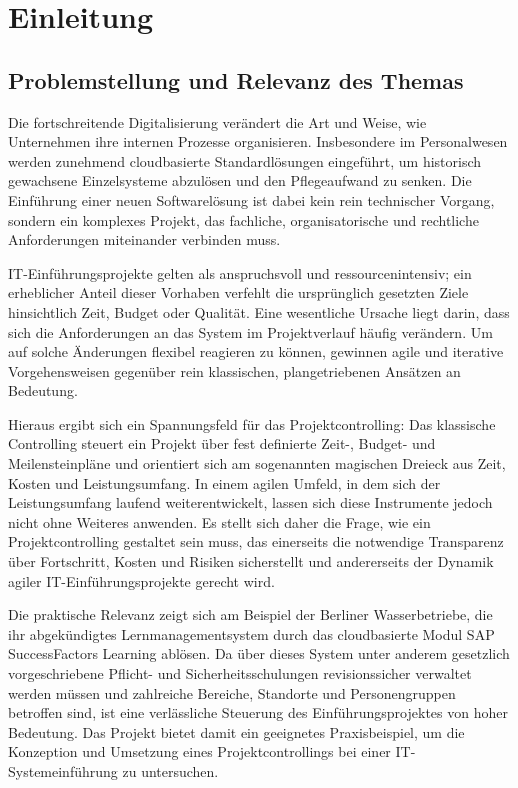 \documentclass[
    12pt, 
    a4paper,
    ]{scrartcl} %
\begin{document}
\newpage
{} %
\setcounter{page}{1}


\section{Einleitung}

\subsection{Problemstellung und Relevanz des Themas}
Die fortschreitende Digitalisierung verändert die Art und Weise, wie Unternehmen ihre internen Prozesse organisieren. Insbesondere im Personalwesen werden zunehmend cloudbasierte Standardlösungen eingeführt, um historisch gewachsene Einzelsysteme abzulösen und den Pflegeaufwand zu senken. Die Einführung einer neuen Softwarelösung ist dabei kein rein technischer Vorgang, sondern ein komplexes Projekt, das fachliche, organisatorische und rechtliche Anforderungen miteinander verbinden muss.

IT-Einführungsprojekte gelten als anspruchsvoll und ressourcenintensiv; ein erheblicher Anteil dieser Vorhaben verfehlt die ursprünglich gesetzten Ziele hinsichtlich Zeit, Budget oder Qualität. Eine wesentliche Ursache liegt darin, dass sich die Anforderungen an das System im Projektverlauf häufig verändern. Um auf solche Änderungen flexibel reagieren zu können, gewinnen agile und iterative Vorgehensweisen gegenüber rein klassischen, plangetriebenen Ansätzen an Bedeutung.

Hieraus ergibt sich ein Spannungsfeld für das Projektcontrolling: Das klassische Controlling steuert ein Projekt über fest definierte Zeit-, Budget- und Meilensteinpläne und orientiert sich am sogenannten magischen Dreieck aus Zeit, Kosten und Leistungsumfang. In einem agilen Umfeld, in dem sich der Leistungsumfang laufend weiterentwickelt, lassen sich diese Instrumente jedoch nicht ohne Weiteres anwenden. Es stellt sich daher die Frage, wie ein Projektcontrolling gestaltet sein muss, das einerseits die notwendige Transparenz über Fortschritt, Kosten und Risiken sicherstellt und andererseits der Dynamik agiler IT-Einführungsprojekte gerecht wird.

Die praktische Relevanz zeigt sich am Beispiel der Berliner Wasserbetriebe, die ihr abgekündigtes Lernmanagementsystem durch das cloudbasierte Modul SAP SuccessFactors Learning ablösen. Da über dieses System unter anderem gesetzlich vorgeschriebene Pflicht- und Sicherheitsschulungen revisionssicher verwaltet werden müssen und zahlreiche Bereiche, Standorte und Personengruppen betroffen sind, ist eine verlässliche Steuerung des Einführungsprojektes von hoher Bedeutung. Das Projekt bietet damit ein geeignetes Praxisbeispiel, um die Konzeption und Umsetzung eines Projektcontrollings bei einer IT-Systemeinführung zu untersuchen.
\end{document}
